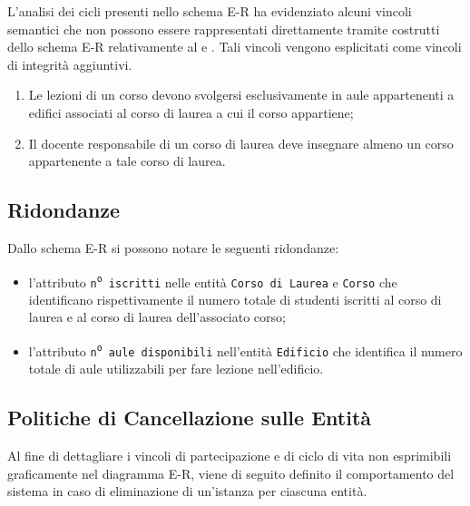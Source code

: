 \documentclass[a4paper,11pt]{article}
\begin{document}
L'analisi dei cicli presenti nello schema E-R ha evidenziato alcuni vincoli semantici che non possono essere rappresentati direttamente tramite costrutti dello schema E-R relativamente al  e .
Tali vincoli vengono esplicitati come vincoli di integrità aggiuntivi.


\begin{enumerate}[label=\textbf{Vincolo Integrità \arabic*:}, ref=\textbf{Vincolo Integrità \arabic*}, series=integrity-constraints, leftmargin=*]
    \item Le lezioni di un corso devono svolgersi esclusivamente in aule appartenenti a edifici associati al corso di laurea a cui il corso appartiene;
    \label{ic:building_course}
    
    \item Il docente responsabile di un corso di laurea deve insegnare almeno un corso appartenente a tale corso di laurea.
    \label{ic:responsable_course}
\end{enumerate}


\subsection{Ridondanze}
\label{sec:all_redundancy}

Dallo schema E-R si possono notare le seguenti ridondanze:

\begin{itemize}
    \item l'attributo \texttt{n\textsuperscript{o} iscritti} nelle entità \texttt{Corso di Laurea} e \texttt{Corso} che identificano rispettivamente il numero totale di studenti iscritti al corso di laurea e al corso di laurea dell'associato corso;
    \item l'attributo \texttt{n\textsuperscript{o} aule disponibili} nell'entità \texttt{Edificio} che identifica il numero totale di aule utilizzabili per fare lezione nell'edificio.
\end{itemize}


\subsection{Politiche di Cancellazione sulle Entità}
\label{sec:entity_deletion_policies}

Al fine di dettagliare i vincoli di partecipazione e di ciclo di vita non esprimibili graficamente nel diagramma E-R, viene di seguito definito il comportamento del sistema in caso di eliminazione di un'istanza per ciascuna entità.
\end{document}
